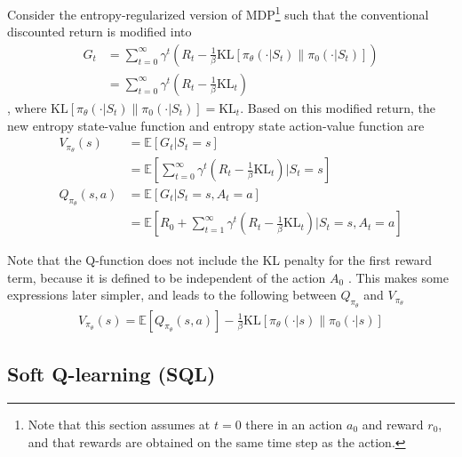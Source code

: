 \documentclass[12pt]{report}
\begin{document}
Consider the entropy-regularized version of MDP\footnote{Note that this section assumes at $t=0$ there in an action $a_0$ and reward $r_0$, and that rewards are obtained on the same time step as the action.} such that the conventional discounted return is modified into
\begin{align}
    G_t &= \sum_{t=0}^\infty \gamma^t\left(R_t-\frac{1}{\beta}\text{KL}[\pi_\theta(\cdot |S_t)\|\pi_0(\cdot |S_t)]\right)\nonumber\\
    &= \sum_{t=0}^\infty \gamma^t\left(R_t-\frac{1}{\beta}\text{KL}_t\right)\label{eq:reg_rwd}
\end{align}
, where $\text{KL}[\pi_\theta(\cdot |S_t)\|\pi_0(\cdot |S_t)] = \text{KL}_t$. Based on this modified return, the new entropy state-value function and entropy state action-value function are
\begin{align}
    V_{\pi_\theta}(s)&=\mathbb{E}[G_t|S_t=s] \nonumber\\
    &=\mathbb{E}\left[\sum_{t=0}^\infty\gamma^t\left(R_t-\frac{1}{\beta}\text{KL}_t\right)\Big|S_t=s\right]\label{eq2.11}\\
    Q_{\pi_\theta}(s,a)&=\mathbb{E}[G_t|S_t=s,A_t=a] \nonumber\\
    &=\mathbb{E}\left[R_0+\sum_{t=1}^\infty \gamma^t\left(R_t - \frac{1}{\beta}\text{KL}_t\right)\Big|S_t=s,A_t=a\right]\label{eq2.12}
\end{align}

Note that the Q-function does not include the KL penalty for the first reward term, because it is defined to be independent of the action $A_0$ \cite{schulman2017equivalence}. This makes some expressions later simpler, and leads to the following between $Q_{\pi_\theta}$ and $V_{\pi_\theta}$
\begin{align}
    V_{\pi_\theta}(s) = \mathbb{E}[Q_{\pi_\theta}(s,a)]-\frac{1}{\beta}\text{KL}[\pi_\theta(\cdot|s)\|\pi_0(\cdot|s)]
\end{align}

\subsection{Soft Q-learning (SQL)} \label{sec:SQL}

\end{document}
